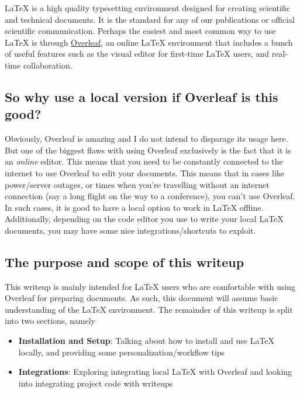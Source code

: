 \graphicspath{{Parts/1_Introductions/graphics/}}

\LaTeX{}{} is a high quality typesetting environment designed for creating scientific and technical documents. It is the standard for any of our publications or official scientific communication. Perhaps the easiest and most common way to use \LaTeX{}{} is through \hyperlink{https://www.overleaf.com}{Overleaf}, an online \LaTeX{} environment that includes a bunch of useful features such as the visual editor for first-time \LaTeX{} users, and real-time collaboration.

\subsection{So why use a local version if Overleaf is this good?}
Obviously, Overleaf is amazing and I do not intend to disparage its usage here. But one of the biggest flaws with using Overleaf exclusively is the fact that it is an \emph{online} editor. This means that you need to be constantly connected to the internet to use Overleaf to edit your documents. This means that in cases like power/server outages, or times when you're travelling without an internet connection (say a long flight on the way to a conference), you can't use Overleaf. In such cases, it is good to have a local option to work in \LaTeX{} offline. Additionally, depending on the code editor you use to write your local \LaTeX{} documents, you may have some nice integrations/shortcuts to exploit.

\subsection{The purpose and scope of this writeup}
This writeup is mainly intended for \LaTeX{} users who are comfortable with using Overleaf for preparing documents. As such, this document will assume basic understanding of the \LaTeX{} environment. The remainder of this writeup is split into two sections, namely
\begin{itemize}
    \item \textbf{Installation and Setup}: Talking about how to install and use \LaTeX{} locally, and providing some personalization/workflow tips
    \item \textbf{Integrations}: Exploring integrating local \LaTeX{} with Overleaf and looking into integrating project code with writeups
\end{itemize}

